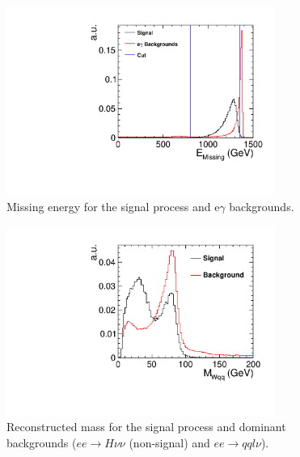 \begin{figure}
  \centering
  \includegraphics[width=0.78\textwidth,keepaspectratio]{HiggsAnalysis/figures/EMissing_PreSelection_alt}
  \caption[Missing energy of signal and e$\gamma$ events]{Missing energy for the signal process and e$\gamma$ backgrounds.}
  \label{fig:EMissPreSelAlt}
\end{figure}

\begin{figure}
  \centering
  \includegraphics[width=0.78\textwidth,keepaspectratio]{HiggsAnalysis/figures/MWqq_PreSelection}
  \caption[Reconstructed W mass for signal and background events]{Reconstructed mass for the signal process and dominant backgrounds ($ee\rightarrow H\nu\nu$ (non-signal) and $ee\rightarrow qql\nu$).}
  \label{fig:WMass}
\end{figure}


